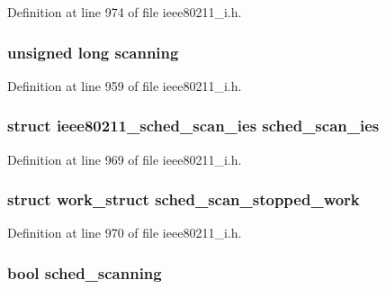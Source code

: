 Definition at line 974 of file ieee80211\-\_\-i.\-h.

\hypertarget{structieee80211__local_aa4734c7bf0bba0e87ccf874423c3c79a}{
\subsubsection[{scanning}]{\setlength{\rightskip}{0pt plus 5cm}unsigned long scanning}}\label{structieee80211__local_aa4734c7bf0bba0e87ccf874423c3c79a}


Definition at line 959 of file ieee80211\-\_\-i.\-h.

\hypertarget{structieee80211__local_a1dbb796d0082174e8a7f69314a3bfc90}{
\subsubsection[{sched\-\_\-scan\-\_\-ies}]{\setlength{\rightskip}{0pt plus 5cm}struct ieee80211\-\_\-sched\-\_\-scan\-\_\-ies sched\-\_\-scan\-\_\-ies}}\label{structieee80211__local_a1dbb796d0082174e8a7f69314a3bfc90}


Definition at line 969 of file ieee80211\-\_\-i.\-h.

\hypertarget{structieee80211__local_a0724e881582b025d21006614b3f63066}{
\subsubsection[{sched\-\_\-scan\-\_\-stopped\-\_\-work}]{\setlength{\rightskip}{0pt plus 5cm}struct work\-\_\-struct sched\-\_\-scan\-\_\-stopped\-\_\-work}}\label{structieee80211__local_a0724e881582b025d21006614b3f63066}


Definition at line 970 of file ieee80211\-\_\-i.\-h.

\hypertarget{structieee80211__local_abd8e66f3e46d5bb5d08224d0960a29b6}{
\subsubsection[{sched\-\_\-scanning}]{\setlength{\rightskip}{0pt plus 5cm}bool sched\-\_\-scanning}}\label{structieee80211__local_abd8e66f3e46d5bb5d08224d0960a29b6}


